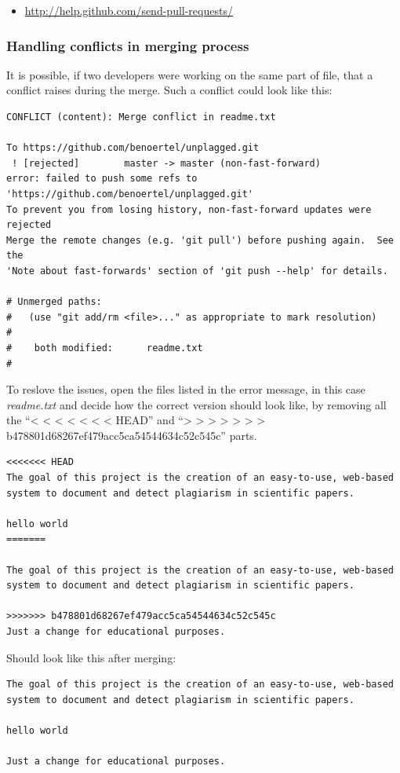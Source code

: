 \begin{itemize}
\item \url{http://help.github.com/send-pull-requests/}
\end{itemize}

\subsubsection{Handling conflicts in merging process}
It is possible, if two developers were working on the same part of  file, that a conflict raises during the merge. Such 
a conflict could look like this:

\begin{lstlisting}
CONFLICT (content): Merge conflict in readme.txt

To https://github.com/benoertel/unplagged.git
 ! [rejected]        master -> master (non-fast-forward)
error: failed to push some refs to 'https://github.com/benoertel/unplagged.git'
To prevent you from losing history, non-fast-forward updates were rejected
Merge the remote changes (e.g. 'git pull') before pushing again.  See the
'Note about fast-forwards' section of 'git push --help' for details.

# Unmerged paths:
#   (use "git add/rm <file>..." as appropriate to mark resolution)
#
#    both modified:      readme.txt
#
\end{lstlisting}

To reslove the issues, open the files listed in the error message, in this case \textit{readme.txt} and decide how the correct 
version should look like, by removing all the \enquote{< < < < < < <  HEAD} and 
\enquote{> > > > > > > b478801d68267ef479acc5ca54544634c52c545c} 
parts.

\begin{lstlisting}[caption=Creating branches]
<<<<<<< HEAD
The goal of this project is the creation of an easy-to-use, web-based
system to document and detect plagiarism in scientific papers.

hello world
=======

The goal of this project is the creation of an easy-to-use, web-based
system to document and detect plagiarism in scientific papers.

>>>>>>> b478801d68267ef479acc5ca54544634c52c545c
Just a change for educational purposes.
\end{lstlisting}

Should look like this after merging:

\begin{lstlisting}[caption=Creating branches]
The goal of this project is the creation of an easy-to-use, web-based
system to document and detect plagiarism in scientific papers.

hello world

Just a change for educational purposes.
\end{lstlisting}

